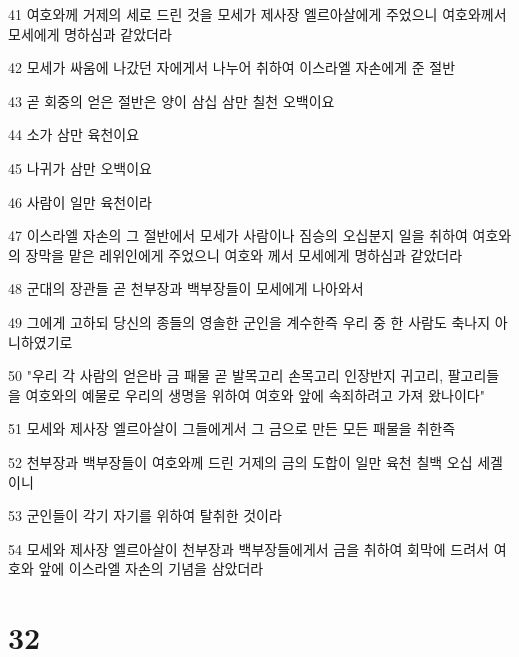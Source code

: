 \par 41 여호와께 거제의 세로 드린 것을 모세가 제사장 엘르아살에게 주었으니 여호와께서 모세에게 명하심과 같았더라
\par 42 모세가 싸움에 나갔던 자에게서 나누어 취하여 이스라엘 자손에게 준 절반
\par 43 곧 회중의 얻은 절반은 양이 삼십 삼만 칠천 오백이요
\par 44 소가 삼만 육천이요
\par 45 나귀가 삼만 오백이요
\par 46 사람이 일만 육천이라
\par 47 이스라엘 자손의 그 절반에서 모세가 사람이나 짐승의 오십분지 일을 취하여 여호와의 장막을 맡은 레위인에게 주었으니 여호와 께서 모세에게 명하심과 같았더라
\par 48 군대의 장관들 곧 천부장과 백부장들이 모세에게 나아와서
\par 49 그에게 고하되 당신의 종들의 영솔한 군인을 계수한즉 우리 중 한 사람도 축나지 아니하였기로
\par 50 "우리 각 사람의 얻은바 금 패물 곧 발목고리 손목고리 인장반지 귀고리, 팔고리들을 여호와의 예물로 우리의 생명을 위하여 여호와 앞에 속죄하려고 가져 왔나이다"
\par 51 모세와 제사장 엘르아살이 그들에게서 그 금으로 만든 모든 패물을 취한즉
\par 52 천부장과 백부장들이 여호와께 드린 거제의 금의 도합이 일만 육천 칠백 오십 세겔이니
\par 53 군인들이 각기 자기를 위하여 탈취한 것이라
\par 54 모세와 제사장 엘르아살이 천부장과 백부장들에게서 금을 취하여 회막에 드려서 여호와 앞에 이스라엘 자손의 기념을 삼았더라

\chapter{32}

